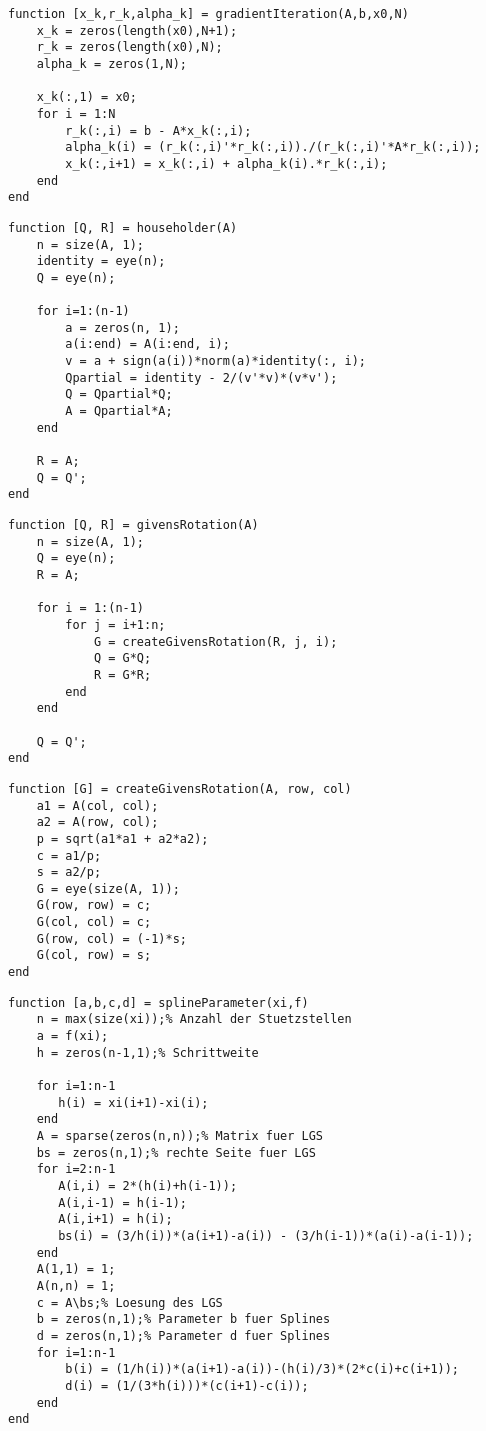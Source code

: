 \documentclass[german]{latex4ei/latex4ei_fs}
\begin{document}
\begin{lstlisting}
function [x_k,r_k,alpha_k] = gradientIteration(A,b,x0,N)
    x_k = zeros(length(x0),N+1);
    r_k = zeros(length(x0),N);
    alpha_k = zeros(1,N);

    x_k(:,1) = x0;
    for i = 1:N
        r_k(:,i) = b - A*x_k(:,i);
        alpha_k(i) = (r_k(:,i)'*r_k(:,i))./(r_k(:,i)'*A*r_k(:,i));
        x_k(:,i+1) = x_k(:,i) + alpha_k(i).*r_k(:,i);
    end
end
\end{lstlisting}

\begin{lstlisting}
function [Q, R] = householder(A)
    n = size(A, 1);
    identity = eye(n);
    Q = eye(n);

    for i=1:(n-1)
        a = zeros(n, 1);
        a(i:end) = A(i:end, i);
        v = a + sign(a(i))*norm(a)*identity(:, i);
        Qpartial = identity - 2/(v'*v)*(v*v');
        Q = Qpartial*Q;
        A = Qpartial*A;
    end

    R = A;
    Q = Q';
end
\end{lstlisting}

\begin{lstlisting}
function [Q, R] = givensRotation(A)
    n = size(A, 1);
    Q = eye(n);
    R = A;

    for i = 1:(n-1)
        for j = i+1:n;
            G = createGivensRotation(R, j, i);
            Q = G*Q;
            R = G*R;
        end
    end

    Q = Q';
end
\end{lstlisting}

\begin{lstlisting}
function [G] = createGivensRotation(A, row, col)
    a1 = A(col, col);
    a2 = A(row, col);
    p = sqrt(a1*a1 + a2*a2);
    c = a1/p;
    s = a2/p;
    G = eye(size(A, 1));
    G(row, row) = c;
    G(col, col) = c;
    G(row, col) = (-1)*s;
    G(col, row) = s;
end
\end{lstlisting}

\begin{lstlisting}
function [a,b,c,d] = splineParameter(xi,f)
	n = max(size(xi));% Anzahl der Stuetzstellen
	a = f(xi);
    h = zeros(n-1,1);% Schrittweite

    for i=1:n-1
       h(i) = xi(i+1)-xi(i);
    end
    A = sparse(zeros(n,n));% Matrix fuer LGS
    bs = zeros(n,1);% rechte Seite fuer LGS
    for i=2:n-1
       A(i,i) = 2*(h(i)+h(i-1));
       A(i,i-1) = h(i-1);
       A(i,i+1) = h(i);
       bs(i) = (3/h(i))*(a(i+1)-a(i)) - (3/h(i-1))*(a(i)-a(i-1));
    end
    A(1,1) = 1;
    A(n,n) = 1;
    c = A\bs;% Loesung des LGS
    b = zeros(n,1);% Parameter b fuer Splines
    d = zeros(n,1);% Parameter d fuer Splines
    for i=1:n-1
        b(i) = (1/h(i))*(a(i+1)-a(i))-(h(i)/3)*(2*c(i)+c(i+1));
        d(i) = (1/(3*h(i)))*(c(i+1)-c(i));
    end
end
\end{lstlisting}
\end{document}
